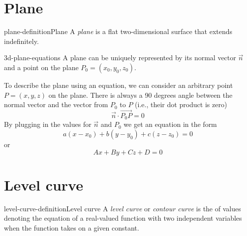 \documentclass[preview]{standalone}
\begin{document}
\genpage

\section{Plane}

\begin{snippetdefinition}{plane-definition}{Plane}
    A \textit{plane} is a flat two-dimensional surface that extends indefinitely.
\end{snippetdefinition}

\begin{snippet}{3d-plane-equations}
    A plane can be uniquely represented by its
    normal vector \(\vec{n}\)
    and a point on the plane \(P_0=(x_0, y_0, z_0)\).

    To describe the plane using an equation, we can
    consider an arbitrary point \(P=(x,y,z)\) on the plane.
    There is always a 90 degrees angle between the normal
    vector and the vector from \(P_0\) to \(P\) (i.e., their dot product is zero)
    \[
        \vec{n} \cdot \overrightarrow{P_0 P} = 0
    \]
    By plugging in the values for \(\vec{n}\) and \(P_0\)
    we get an equation in the form
    \[
        a(x-x_0) + b(y-y_0) + c(z-z_0) = 0
    \]
    or
    \[
        Ax+By+Cz+D=0
    \]
\end{snippet}

\section{Level curve}


\begin{snippetdefinition}{level-curve-definition}{Level curve}
    A \textit{level curve} or \textit{contour curve}
    is the \set of values denoting the equation
    of a real-valued function with two independent variables
    when the function takes on a given constant.
\end{snippetdefinition}



\end{document}
